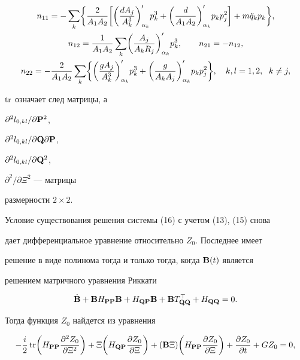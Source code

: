 \begin{gather*} 


n_{11}=-\sum_k\biggl\{\frac{2}{A_1A_2}\biggl[\biggl( 


\frac{dA_j}{A^3_k}\biggr)'_{\alpha_k}p^3_k+ 


\biggl(\frac{d}{A_1A_2}\biggr)'_{\alpha_k}p_kp^2_j\biggr] 


+m\Ddot q_kp_k\biggr\},\\ 


n_{12}=\frac{1}{A_1A_2}\sum_k\biggl(\frac{A_j}{A_kR_j} 


\biggr)'_{\alpha_k}p^3_k,\qquad n_{21}=-n_{12},\\ 


n_{22}=-\frac{2}{A_1A_2}\sum_k\biggl\{\biggl( 


\frac{gA_j}{A^3_k}\biggr)'_{\alpha_k}p^3_k+ 


\biggl(\frac{g}{A_kA_j}\biggr)'_{\alpha_k}p_kp^2_j\biggr\}, 


\quad k,l=1,2,\ \; k\ne j, 


\end{gather*} 


$\operatorname{tr}$ означает след матрицы, а


$\partial^2l_{0,kl}/\partial\bold P^2$,


$\partial^2l_{0,kl}/\partial\bold Q\partial\bold P$,


$\partial^2l_{0,kl}/\partial\bold Q^2$, 


$\partial^2/\partial\Xi^2$ --- матрицы 


размерности $2\times 2$. 


 


Условие существования решения системы (16) с учетом (13), (15) снова 


дает дифференциальное уравнение относительно $Z_0$. Последнее имеет 


решение в виде полинома тогда и только тогда, когда $\bold B(t)$ является 


решением матричного уравнения Риккати 


\begin{equation} 


\Dot{\BB}+\BB H_{\BP\BP}\BB+H_{\BQ\BP}\BB+ 


\BB T^\top_{\BQ\BQ}+H_{\BQ\BQ}=0. 


\end{equation} 


Тогда функция $Z_0$ найдется из уравнения 


\begin{equation} 


-\frac{i}{2}\tr\biggl( H_{\BP\BP} 


\frac{\partial^2Z_0}{\partial\Xi^2}\biggr)+\Xi\biggl( 


H_{\BQ\BP}\frac{\partial Z_0}{\partial\Xi}\biggr)+ 


(\BB\Xi)\biggl( H_{\BP\BP} 


\frac{\partial Z_0}{\partial\Xi}\biggr)+ 


\frac{\partial Z_0}{\partial t}+GZ_0=0, 


\end{equation} 


